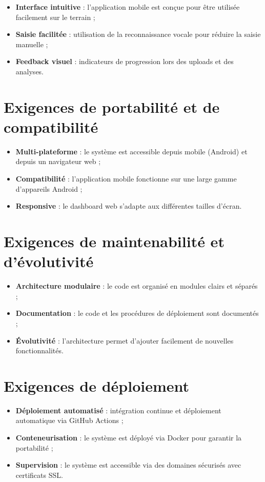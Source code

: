 \documentclass[12pt,a4paper,oneside]{report}
\begin{document}
\begin{itemize}
    \item \textbf{Interface intuitive} : l'application mobile est conçue pour être utilisée facilement sur le terrain ;
    \item \textbf{Saisie facilitée} : utilisation de la reconnaissance vocale pour réduire la saisie manuelle ;
    \item \textbf{Feedback visuel} : indicateurs de progression lors des uploads et des analyses.
\end{itemize}

\section{Exigences de portabilité et de compatibilité}

\begin{itemize}
    \item \textbf{Multi-plateforme} : le système est accessible depuis mobile (Android) et depuis un navigateur web ;
    \item \textbf{Compatibilité} : l'application mobile fonctionne sur une large gamme d'appareils Android ;
    \item \textbf{Responsive} : le dashboard web s'adapte aux différentes tailles d'écran.
\end{itemize}

\section{Exigences de maintenabilité et d'évolutivité}

\begin{itemize}
    \item \textbf{Architecture modulaire} : le code est organisé en modules clairs et séparés ;
    \item \textbf{Documentation} : le code et les procédures de déploiement sont documentés ;
    \item \textbf{Évolutivité} : l'architecture permet d'ajouter facilement de nouvelles fonctionnalités.
\end{itemize}

\section{Exigences de déploiement}

\begin{itemize}
    \item \textbf{Déploiement automatisé} : intégration continue et déploiement automatique via GitHub Actions ;
    \item \textbf{Conteneurisation} : le système est déployé via Docker pour garantir la portabilité ;
    \item \textbf{Supervision} : le système est accessible via des domaines sécurisés avec certificats SSL.
\end{itemize}
\end{document}
